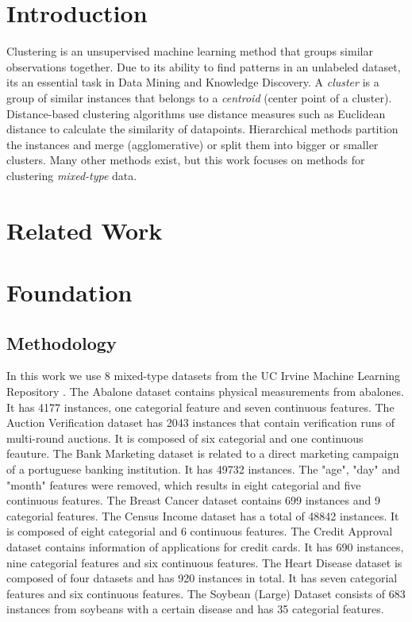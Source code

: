 \chapter{Introduction}

Clustering is an unsupervised machine learning method that groups similar observations together. Due to its ability to find patterns in an unlabeled dataset, its an essential task in Data Mining and Knowledge Discovery. A \textit{cluster} is a group of similar instances that belongs to a \textit{centroid} (center point of a cluster). Distance-based clustering algorithms use distance measures such as Euclidean distance to calculate the similarity of datapoints. Hierarchical methods partition the instances and merge (agglomerative) or split them into bigger or smaller clusters. Many other methods exist, but this work focuses on methods for clustering \textit{mixed-type} data. \cite{mixed_type_survey_2019}

\chapter{Related Work}

\chapter{Foundation}

\section{Methodology}

In this work we use 8 mixed-type datasets from the UC Irvine Machine Learning Repository \cite{uci_ml_rpo}.
The Abalone dataset \cite{abalone} contains physical measurements from abalones. It has 4177 instances, one categorial feature and seven continuous features.
The Auction Verification dataset \cite{auction_verification} has 2043 instances that contain verification runs of multi-round auctions. It is composed of six categorial and one continuous feauture.
The Bank Marketing dataset \cite{bank_marketing} is related to a direct marketing campaign of a portuguese banking institution. It has 49732 instances. The "age", "day" and "month" features were removed, which results in eight categorial and five continuous features.
The Breast Cancer dataset \cite{breast_cancer} contains 699 instances and 9 categorial features.
The Census Income dataset \cite{census_income} has a total of 48842 instances. It is composed of eight categorial and 6 continuous features.
The Credit Approval dataset \cite{credit_approval} contains information of applications for credit cards. It has 690 instances, nine categorial features and six continuous features.
The Heart Disease dataset \cite{heart_disease} is composed of four datasets and has 920 instances in total. It has seven categorial features and six continuous features.
The Soybean (Large) Dataset \cite{abalone} consists of 683 instances from soybeans with a certain disease and has 35 categorial features.

